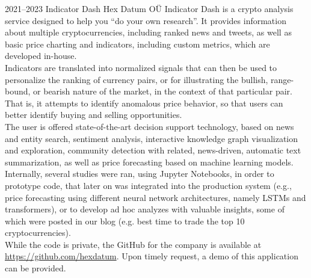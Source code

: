 \documentclass{friggeri-cv}
\begin{document}
\begin{entrylist}
\entry
{2021--2023}
{Indicator Dash}
{Hex Datum OÜ}
{Indicator Dash is a crypto analysis service designed to help you ``do your own research''. It provides information about multiple cryptocurrencies, including ranked news and tweets, as well as basic price charting and indicators, including custom metrics, which are developed in-house.\\

Indicators are translated into normalized signals that can then be used to personalize the ranking of currency pairs, or for illustrating the bullish, range-bound, or bearish nature of the market, in the context of that particular pair. That is, it attempts to identify anomalous price behavior, so that users can better identify buying and selling opportunities.\\

The user is offered state-of-the-art decision support technology, based on news and entity search, sentiment analysis, interactive knowledge graph visualization and exploration, community detection with related, news-driven, automatic text summarization, as well as price forecasting based on machine learning models.\\

Internally, several studies were ran, using Jupyter Notebooks, in order to prototype code, that later on was integrated into the production system (e.g., price forecasting using different neural network architectures, namely LSTMs and transformers), or to develop ad hoc analyzes with valuable insights, some of which were posted in our blog (e.g. best time to trade the top 10 cryptocurrencies).\\

While the code is private, the GitHub for the company is available at \url{https://github.com/hexdatum}. Upon timely request, a demo of this application can be provided.}
\end{entrylist}
\end{document}
